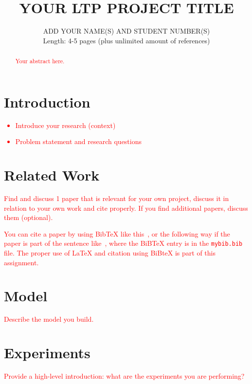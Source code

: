 \documentclass[11pt]{article}
\title{YOUR LTP PROJECT TITLE}
\author{ADD YOUR NAME(S) AND STUDENT NUMBER(S)\\
Length: 4-5 pages (plus unlimited amount of references)}
\date{}
\begin{document}
\maketitle

\begin{abstract}
\textcolor{red}{Your abstract here.}
\end{abstract}


\section{Introduction}

\textcolor{red}{
\begin{itemize}
\item Introduce your research (context)
\item Problem statement and research questions
\end{itemize}
} 

\section{Related Work}

\textcolor{red}{Find and discuss 1 paper that is relevant for your own project, discuss it in relation to your own work and cite properly. If you find additional papers, discuss them (optional).}

\textcolor{red}{You can cite a paper by using BibTeX like this~\citep{Culotta:ea:2014}, or the following way if the paper is part of the sentence like~\cite{Culotta:ea:2014}, where the BiBTeX entry is in the \texttt{mybib.bib} file. The proper use of \LaTeX{} and citation using BiBteX is part of this assignment.} 

\section{Model} %

\textcolor{red}{Describe the model you build. }


\section{Experiments}

\textcolor{red}{Provide a high-level introduction: what are the experiments you are performing?}
\end{document}
